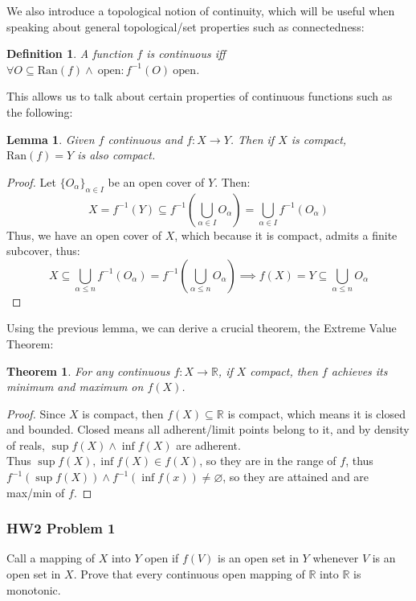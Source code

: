 \documentclass[10pt,letterpaper]{article} %
\newtheorem{thm}{Theorem}[section]
\newtheorem{lem}{Lemma}[section]
\newtheorem{defn}{Definition}[section]
\begin{document}
\medskip
We also introduce a topological notion of continuity, which will be useful when speaking about general topological/set properties such as connectedness:
\begin{defn}
A function $f$ is continuous iff $\forall O \subseteq \text{Ran}(f) \land \ \text{open}: f^{-1}(O) \ \text{open}$.
\end{defn}

This allows us to talk about certain properties of continuous functions such as the following:
\begin{lem}
Given $f$ continuous and $f: X \xrightarrow{} Y$. Then if $X$ is compact, $\text{Ran}(f) = Y$ is also compact.
\end{lem}
\begin{proof}
Let $\{O_\alpha\}_{\alpha \in I}$ be an open cover of $Y$. Then:
\begin{equation*}
  X = f^{-1}(Y) \subseteq f^{-1}\left(\bigcup_{\alpha \in I}O_\alpha\right) = \bigcup_{\alpha \in I}f^{-1}(O_\alpha)
\end{equation*}
Thus, we have an open cover of $X$, which because it is compact, admits a finite subcover, thus:
\begin{equation*}
  X \subseteq \bigcup_{\alpha \leqslant n}f^{-1}(O_\alpha) = f^{-1}\left(\bigcup_{\alpha \leqslant n}O_\alpha\right) \implies f(X) = Y \subseteq \bigcup_{\alpha \leqslant n}O_\alpha
\end{equation*}
\end{proof}

Using the previous lemma, we can derive a crucial theorem, the Extreme Value Theorem:
\begin{thm}
For any continuous $f: X \xrightarrow{} \mathbb{R}$, if $X$ compact, then $f$ achieves its minimum and maximum on $f(X)$. 
\end{thm}
\begin{proof}
Since $X$ is compact, then $f(X) \subseteq \mathbb{R}$ is compact, which means it is closed and bounded. Closed means all adherent/limit points belong to it, and by density of reals, $\sup f(X) \land \inf f(X)$ are adherent.\\

Thus $\sup f(X), \inf f(X) \in f(X)$, so they are in the range of $f$, thus $f^{-1}(\sup f(X)) \land f^{-1}(\inf f(x)) \neq \varnothing$, so they are attained and are max/min of $f$.
\end{proof}

\subsubsection{HW2 Problem 1}
Call a mapping of $X$ into $Y$ open if $f(V)$ is an open set in $Y$ whenever $V$ is an open set in $X$. Prove that every continuous open mapping of $\mathbb{R}$ into $\mathbb{R}$ is monotonic.
\end{document}
